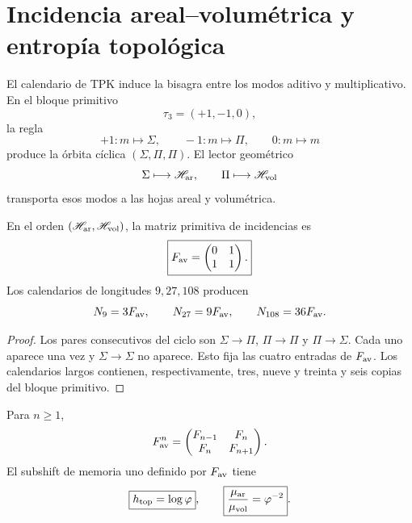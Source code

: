 \section{Incidencia areal--volumétrica y entropía topológica}

El calendario de TPK induce la bisagra entre los modos aditivo y
multiplicativo. En el bloque primitivo
\[
 \tau_3=(+1,-1,0),
\]
la regla
\[
 +1:m\mapsto\Sigma,
 \qquad
 -1:m\mapsto\Pi,
 \qquad
 0:m\mapsto m
\]
produce la órbita cíclica \((\Sigma,\Pi,\Pi)\). El lector geométrico
\[
 \Sigma\longmapsto\mathscr H_{\rm ar},
 \qquad
 \Pi\longmapsto\mathscr H_{\rm vol}
\]
transporta esos modos a las hojas areal y volumétrica.

\begin{theorem}
\label{v:thm:incidencia-hojas-anexo}
En el orden \((\mathscr H_{\rm ar},\mathscr H_{\rm vol})\), la matriz
primitiva de incidencias es
\begin{equation}
 \boxed{
 F_{\rm av}=
 \begin{pmatrix}0&1\\1&1\end{pmatrix}.}
 \label{v:eq:fav-anexo-informacion}
\end{equation}
Los calendarios de longitudes \(9,27,108\) producen
\[
 N_9=3F_{\rm av},
 \qquad N_{27}=9F_{\rm av},
 \qquad N_{108}=36F_{\rm av}.
\]
\end{theorem}

\begin{proof}
Los pares consecutivos del ciclo son
\(\Sigma\to\Pi\), \(\Pi\to\Pi\) y \(\Pi\to\Sigma\). Cada uno aparece una
vez y \(\Sigma\to\Sigma\) no aparece. Esto fija las cuatro entradas de
\(F_{\rm av}\). Los calendarios largos contienen, respectivamente, tres,
nueve y treinta y seis copias del bloque primitivo.
\end{proof}

\begin{theorem}
\label{v:thm:fibonacci-parry-anexo}
Para \(n\geq1\),
\begin{equation}
 F_{\rm av}^{n}
 =\begin{pmatrix}F_{n-1}&F_n\\F_n&F_{n+1}\end{pmatrix}.
 \label{v:eq:potencias-fav-anexo}
\end{equation}
El subshift de memoria uno definido por \(F_{\rm av}\) tiene
\begin{equation}
 \boxed{h_{\rm top}=\log\varphi},
 \qquad
 \boxed{\frac{\mu_{\rm ar}}{\mu_{\rm vol}}=\varphi^{-2}}.
 \label{v:eq:entropia-parry-hojas-anexo}
\end{equation}
\end{theorem}

